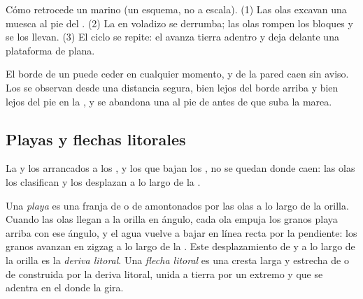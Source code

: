 \begin{omfigure}
{\small Cómo retrocede un  marino (un esquema, no a escala).
(1) Las olas excavan una muesca al pie del . (2) La  en
voladizo se derrumba; las olas rompen los bloques y se los llevan. (3) El
ciclo se repite: el  avanza tierra adentro y deja delante una
plataforma de  plana.}
\label{fig:g9:landforms:cliff-retreat}
\end{omfigure}

\begin{safety}
El borde de un  puede ceder en cualquier momento, y de la pared
caen  sin aviso. Los  se observan desde una distancia
segura, bien lejos del borde arriba y bien lejos del pie en la , y se
abandona una  al pie de  antes de que suba la marea.
\end{safety}

\subsection{Playas y flechas litorales}

La  y los  arrancados a los , y los que bajan los
, no se quedan donde caen: las olas los clasifican y los desplazan a
lo largo de la .

\begin{definition}\label{def:g9:landforms:beach}
Una \emph{playa} es una franja de  o de 
amontonados por las olas a lo largo de la orilla. Cuando las olas llegan a
la orilla en ángulo, cada ola empuja los granos playa arriba con ese
ángulo, y el agua vuelve a bajar en línea recta por la pendiente: los
granos avanzan en zigzag a lo largo de la . Este desplazamiento de
 y  a lo largo de la orilla es la \emph{deriva
litoral}. Una
\emph{flecha litoral} es una cresta larga y
estrecha de  o de  construida por la deriva litoral, unida a tierra por un extremo y que se adentra en el
 donde la  gira.
\end{definition}

